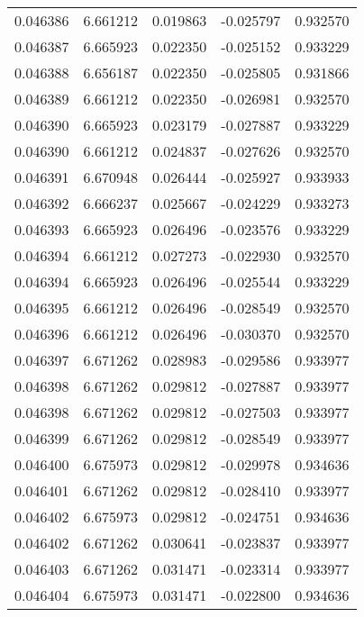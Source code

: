 \begin{tabular}{lrrrr}
0.046386    &  6.661212 &  0.019863 & -0.025797 &             0.932570 \\
0.046387    &  6.665923 &  0.022350 & -0.025152 &             0.933229 \\
0.046388    &  6.656187 &  0.022350 & -0.025805 &             0.931866 \\
0.046389    &  6.661212 &  0.022350 & -0.026981 &             0.932570 \\
0.046390    &  6.665923 &  0.023179 & -0.027887 &             0.933229 \\
0.046390    &  6.661212 &  0.024837 & -0.027626 &             0.932570 \\
0.046391    &  6.670948 &  0.026444 & -0.025927 &             0.933933 \\
0.046392    &  6.666237 &  0.025667 & -0.024229 &             0.933273 \\
0.046393    &  6.665923 &  0.026496 & -0.023576 &             0.933229 \\
0.046394    &  6.661212 &  0.027273 & -0.022930 &             0.932570 \\
0.046394    &  6.665923 &  0.026496 & -0.025544 &             0.933229 \\
0.046395    &  6.661212 &  0.026496 & -0.028549 &             0.932570 \\
0.046396    &  6.661212 &  0.026496 & -0.030370 &             0.932570 \\
0.046397    &  6.671262 &  0.028983 & -0.029586 &             0.933977 \\
0.046398    &  6.671262 &  0.029812 & -0.027887 &             0.933977 \\
0.046398    &  6.671262 &  0.029812 & -0.027503 &             0.933977 \\
0.046399    &  6.671262 &  0.029812 & -0.028549 &             0.933977 \\
0.046400    &  6.675973 &  0.029812 & -0.029978 &             0.934636 \\
0.046401    &  6.671262 &  0.029812 & -0.028410 &             0.933977 \\
0.046402    &  6.675973 &  0.029812 & -0.024751 &             0.934636 \\
0.046402    &  6.671262 &  0.030641 & -0.023837 &             0.933977 \\
0.046403    &  6.671262 &  0.031471 & -0.023314 &             0.933977 \\
0.046404    &  6.675973 &  0.031471 & -0.022800 &             0.934636 \\

\end{tabular}
